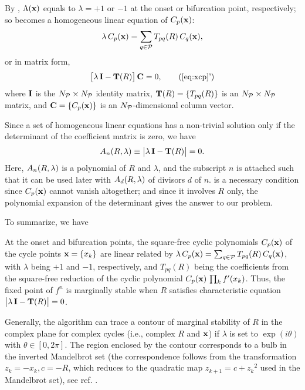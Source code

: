 \documentclass{ws-ijbc}
\begin{document}
By ,
  $\Lambda(\mathbf{x})$ equals to $\lambda = +1$ or $-1$
  at the onset or bifurcation point,
  respectively;
  so 
  becomes a homogeneous linear equation of
  $C_p(\mathbf{x})$:
\begin{equation}
  \lambda \, C_p(\mathbf{x}) = \sum_{q \in \mathcal P} T_{pq}(R) \, C_q(\mathbf{x}),
\label{eq:xcp}
\end{equation}
%
%
or in matrix form,
\begin{equation}
  \big[ \lambda \, \vct I - \vct T(R) \big] \, \vct C = 0,
\tag{\ref{eq:xcp}'}
\end{equation}
%
%
where
$\mathbf{I}$ is the $N_\mathcal P \times N_\mathcal P$ identity matrix,
$\mathbf{T}(R) = \{T_{pq}(R)\}$ is an $N_\mathcal P \times N_\mathcal P$ matrix,
and
$\mathbf{C} = \{C_p(\mathbf{x})\}$ is an $N_\mathcal P$-dimensional column vector.




Since a set of homogeneous linear equations
  has a non-trivial solution
  only if the determinant of the coefficient matrix
  is zero, we have
\begin{equation}
  A_n(R, \lambda) \equiv \big| \lambda \, \mathbf{I} - \mathbf{T}(R) \big| = 0.
\label{eq:xr}
\end{equation}
Here, $A_n(R, \lambda)$ is a polynomial of $R$ and $\lambda$,
  and the subscript $n$ is attached such that
  it can be used later with $A_d(R, \lambda)$ of divisors $d$ of $n$.
 is a necessary condition
  since $C_p(\mathbf{x})$ cannot vanish altogether;
and since it involves $R$ only,
  the polynomial expansion of the determinant
  gives the answer to our problem.


To summarize, we have
\begin{theorem}
  At the onset and bifurcation points,
  the square-free cyclic polynomials $C_p(\mathbf{x})$
  of the cycle points $\mathbf{x} = \{x_k\}$
  are linear related by %
  $\lambda \, C_p(\mathbf{x}) = \sum_{q \in \mathcal P} T_{pq}(R) \, C_q(\mathbf{x})$,
  with $\lambda$ being $+1$ and $-1$, respectively,
  and $T_{pq}(R)$ being the coefficients
  from the square-free reduction of the cyclic polynomial
  $C_p(\mathbf{x}) \, \prod_k f'(x_k)$. %
  Thus, the fixed point of $f^n$
  is marginally stable when $R$ satisfies
  characteristic equation $\big| \lambda \, \mathbf{I} - \mathbf{T}(R) \big| = 0$.
  \label{thm:main}
\end{theorem}

\begin{remark}
  Generally, the algorithm can trace a contour of marginal stability of $R$
  in the complex plane
  for complex cycles (i.e., complex $R$ and $\mathbf{x}$)
  if $\lambda$ is set to $\exp(i\theta)$ with $\theta \in [0, 2\pi]$.
  The region enclosed by the contour corresponds to a bulb in the inverted Mandelbrot set
  (the correspondence follows from the transformation $z_k = -x_k, c = -R$, which
  reduces  to the quadratic map $z_{k+1} = c + {z_k}^2$
  used in the Mandelbrot set),
  see ref. \cite{stephenson}. %
\end{remark}
\end{document}
